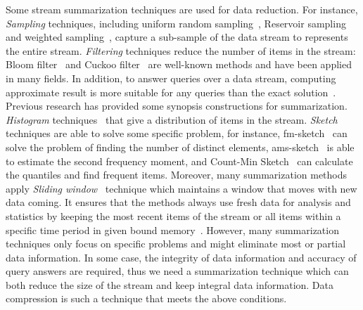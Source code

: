 Some stream summarization techniques are used for data reduction. For instance,
\emph{Sampling} techniques, including uniform random
sampling~\cite{vitter1984faster, Ahrens1985SequentialRS}, Reservoir
sampling~\cite{vitter1985random, Aggarwal2007DataS} and weighted
sampling~\cite{chaudhuri1999random, efraimidis2006weighted}, capture a
sub-sample of the data stream to represents the entire stream. \emph{Filtering}
techniques reduce the number of items in the stream: Bloom
filter~\cite{bloom1970space} and Cuckoo filter~\cite{fan2014cuckoo} are
well-known methods and have been applied in many fields. 
In addition, to  answer queries over a data stream, computing approximate result
is more suitable for any queries than the exact
solution~\cite{kejariwal2015real}. Previous research has provided some synopsis
constructions for summarization. \emph{Histogram}
techniques~\cite{kejariwal2015real, ahmed2019data} that give a distribution of
items in the stream. \emph{Sketch} techniques are able to solve some specific
problem, for instance, \acrfull{fm-sketch}~\cite{flajolet1985probabilistic,
garofalakis2016data} can solve the problem of finding the number of distinct
elements, \acrfull{ams-sketch}~\cite{alon1999space} is able to estimate the
second frequency moment, and Count-Min Sketch~\cite{cormode2005improved,
garofalakis2016data} can calculate the quantiles and find frequent items.
Moreover, many summarization methods apply \emph{Sliding
window}~\cite{datar2002maintaining} technique which maintains a window that
moves with new data coming. It ensures that the methods always use fresh data
for analysis and statistics by keeping the most recent items of the stream or
all items within a specific time period in given bound
memory~\cite{leskovec2014mining}. However, many summarization techniques only
focus on specific problems and might eliminate most or partial data information.
In some case, the integrity of data information and accuracy of query answers
are required, thus we need a summarization technique which can both reduce the
size of the stream and keep integral data information. Data compression is such
a technique that meets the above conditions.

